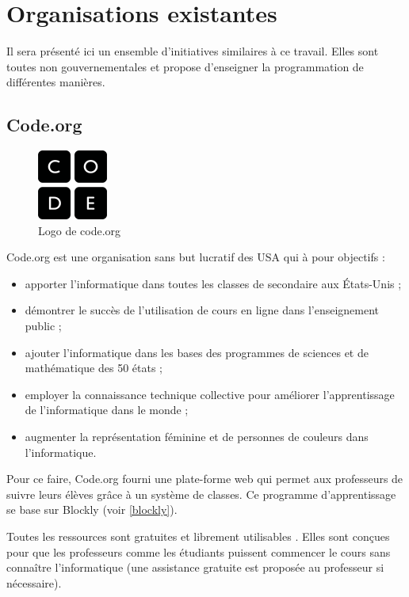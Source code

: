 \section{Organisations existantes}
Il sera présenté ici un ensemble d'initiatives similaires à ce travail. Elles sont toutes non gouvernementales et propose d'enseigner la programmation de différentes manières.
\subsection{Code.org}
\begin{figure}[!h]
  \begin{center}
    \includegraphics[scale=0.5]{content/5-related_work/images/code}
    \caption{Logo de code.org}
    \label{fig:code.org}
  \end{center}
\end{figure}
Code.org \cite{code-org-about} est une organisation sans but lucratif des USA qui à pour objectifs :
\begin{itemize}
  \item apporter l'informatique dans toutes les classes de secondaire aux États-Unis ;
  \item démontrer le succès de l'utilisation de cours en ligne dans l'enseignement public ;
  \item ajouter l'informatique dans les bases des programmes de sciences et de mathématique des 50 états ;
  \item employer la connaissance technique collective pour améliorer l'apprentissage de l'informatique dans le monde ;
  \item augmenter la représentation féminine et de personnes de couleurs dans l'informatique.
\end{itemize}

Pour ce faire, Code.org fourni une plate-forme \cite{code-org-20hr} web qui permet aux professeurs de suivre leurs élèves grâce à un système de classes. Ce programme d'apprentissage se base sur Blockly (voir \ref{blockly}).

Toutes les ressources sont gratuites et librement utilisables \cite{code-org-faq}. Elles sont conçues pour que les professeurs comme les étudiants puissent commencer le cours sans connaître l'informatique (une assistance gratuite est proposée au professeur si nécessaire).


